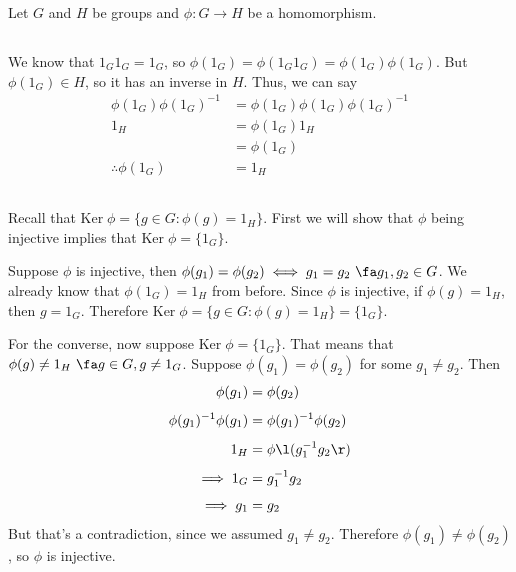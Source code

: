 \documentclass[a4paper]{article}
\newcommand{\Ker}{\text{Ker}\;}
\begin{document}

Let $G$ and $H$ be groups and $\phi : G \to H$ be a homomorphism.

\subsection{}

We know that $1_G 1_G = 1_G$, so $\phi(1_G) = \phi(1_G 1_G) = \phi(1_G) \phi(1_G)$. But $\phi(1_G) \in H$, so it has an inverse in $H$. Thus, we can say \begin{align*}
	\phi(1_G) \phi(1_G)^{-1} &= \phi(1_G) \phi(1_G) \phi(1_G)^{-1}\\[1ex]
	1_H &= \phi(1_G) 1_H\\[1ex]
		&= \phi(1_G)\\[1ex]
	\therefore \phi(1_G) &= 1_H
\end{align*}

\subsection{}

Recall that $\Ker \phi = \{g \in G : \phi(g) = 1_H\}$. First we will show that $\phi$ being injective implies that $\Ker \phi = \{1_G\}$.

Suppose $\phi$ is injective, then $\phi(g_1) = \phi(g_2) \iff g_1 = g_2\ \fa g_1, g_2 \in G$. We already know that $\phi(1_G) = 1_H$ from before. Since $\phi$ is injective, if $\phi(g) = 1_H$, then $g = 1_G$. Therefore $\Ker \phi = \{g \in G : \phi(g) = 1_H\} = \{1_G\}$.

For the converse, now suppose $\Ker \phi = \{1_G\}$. That means that $\phi(g) \ne 1_H\ \fa g \in G, g \ne 1_G$. Suppose $\phi(g_1) = \phi(g_2)$ for some $g_1 \ne g_2$. Then \begin{align*}
	\phi(g_1) &= \phi(g_2)\\[1ex]
	\phi(g_1)^{-1} \phi(g_1) &= \phi(g_1)^{-1} \phi(g_2)\\[1ex]
	1_H &= \phi\l(g_1^{-1} g_2\r)\\[1ex]
	\implies 1_G &= g_1^{-1} g_2\\[1ex]
	\implies g_1 &= g_2
\end{align*}
But that's a contradiction, since we assumed $g_1 \ne g_2$. Therefore $\phi(g_1) \ne \phi(g_2)$, so $\phi$ is injective.

\subsection{}
\end{document}
